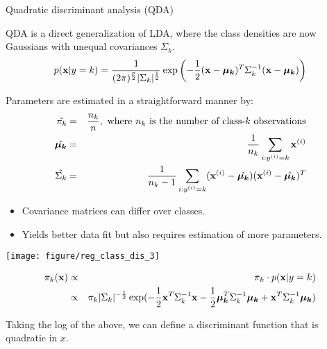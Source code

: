 \documentclass[11pt,compress,t,notes=noshow, xcolor=table]{beamer}
\begin{document}
\begin{vbframe}{Quadratic discriminant analysis (QDA)}

QDA is a direct generalization of LDA, where the class densities are now Gaussians with unequal covariances $\Sigma_k$.
$$
p(\mathbf{x} | y= k) = \frac{1}{(2\pi)^{\frac{p}{2}}|\Sigma_k|^{\frac{1}{2}}} \exp\left(-\frac{1}{2}(\mathbf{x} - \bm{\mu_k})^T \Sigma_k^{-1} (\mathbf{x} - \bm{\mu_k})\right)
$$

\lz

Parameters are estimated in a straightforward manner by:\\
\begin{eqnarray*}
\hat{\pi_{k}} &=& \frac{n_k}{n},\text{ where $n_k$ is the number of class-$k$ observations} \\
\hat{\bm{\mu_k}} &=& \frac{1}{n_k}\sum_{i: y^{(i)} = k} \mathbf{x}^{(i)} \\
\hat{\Sigma_k} &=& \frac{1}{n_k - 1} \sum_{i: y^{(i)} = k} (\mathbf{x}^{(i)} - \hat{\bm{\mu_k}}) (\mathbf{x}^{(i)} - \hat{\bm{\mu_k}})^T \\
\end{eqnarray*}

\framebreak

\begin{itemize}
  \item Covariance matrices can differ over classes.
  \item Yields better data fit but also requires estimation of more parameters.
\end{itemize}

\begin{knitrout}\scriptsize
{}\color{fgcolor}

{\centering \texttt{[image: figure/reg\_class\_dis\_3]} 

}



\end{knitrout}

\framebreak



\begin{eqnarray*}
\pi_{k}(\mathbf{x}) &\propto& \pi_{k} \cdot p(\mathbf{x} | y= k) \\
&\propto& \pi_{k} |\Sigma_k|^{-\frac{1}{2}}\exp(- \frac{1}{2} \mathbf{x}^T\Sigma_k^{-1}\mathbf{x} - \frac{1}{2} \bm{\mu_k}^T \Sigma_k^{-1} \bm{\mu_k} + \mathbf{x}^T \Sigma_k^{-1} \bm{\mu_k} )
\end{eqnarray*}

Taking the log of the above, we can define a discriminant function that is quadratic in $x$.


\end{vbframe}
\end{document}
